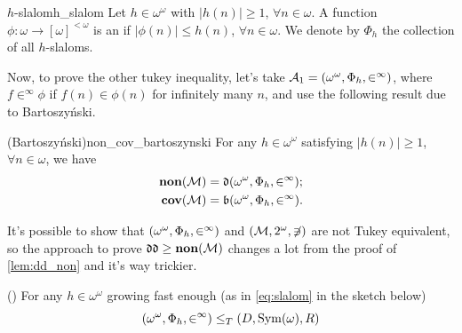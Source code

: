\begin{definition}{$h$-slalom}{h_slalom}
    Let $h\in\omega^\omega$ with $\lvert h(n)\rvert\geq1$, $\forall n\in\omega$. A function $\phi:\omega\to[\omega]^{<\omega}$ is an  if $\lvert\phi(n)\rvert\leq h(n)$, $\forall n\in\omega$. We denote by $\Phi_h$ the collection of all $h$-slaloms.
\end{definition}

Now, to prove the other tukey inequality, let's take $\mathcal{A}_1=(\omega^\omega,\Phi_h,\in^\infty)$, where $f\in^\infty\phi$ if $f(n)\in\phi(n)$ for infinitely many $n$, and use the following result due to Bartoszyński.

\begin{lemma}{(Bartoszyński)}{non_cov_bartoszynski} For any $h\in\omega^\omega$ satisfying $\lvert h(n)\rvert\geq1$, $\forall n\in\omega$, we have
    \begin{align*}
        \textbf{non}(\mathcal{M}) & = \mathfrak{d}{\left(\omega^\omega,\Phi_h,\in^\infty\right)};\\
        \textbf{cov}(\mathcal{M}) & = \mathfrak{b}{\left(\omega^\omega,\Phi_h,\in^\infty\right)}.
    \end{align*}
\end{lemma}

It's possible to show that ${\left(\omega^\omega,\Phi_h,\in^\infty\right)}$ and ${\left(\mathcal{M},2^\omega,\not\ni\right)}$ are not Tukey equivalent, so the approach to prove $\mathfrak{dd}\geq\textbf{non}(\mathcal{M})$ changes a lot from the proof of \cref{lem:dd_non} and it's way trickier.

\begin{lemma}{(\cite{brech})}{} For any $h\in\omega^\omega$ growing fast enough (as in \cref{eq:slalom} in the sketch below)
    $${\left(\omega^\omega,\Phi_h,\in^\infty\right)}\leq_T(D,\mathrm{Sym}(\omega),R)$$
\end{lemma}

